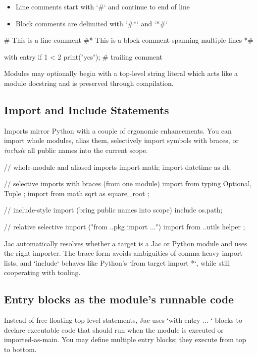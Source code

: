 \begin{itemize}
    \item Line comments start with `#` and continue to end of line
    \item Block comments are delimited with `#*` and `*#`
\end{itemize}

\begin{jacblock}
# This is a line comment
#*
This is a block comment
spanning multiple lines
*#

with entry {
    if 1 < 2 {
        print("yes");  # trailing comment
    }
}
\end{jacblock}

Modules may optionally begin with a top-level string literal which acts like a module docstring and is preserved through compilation.

\subsection{Import and Include Statements}

Imports mirror Python with a couple of ergonomic enhancements. You can import whole modules, alias them, selectively import symbols with braces, or \emph{include} all public names into the current scope.

\begin{jacblock}
// whole-module and aliased imports
import math;
import datetime as dt;

// selective imports with braces (from one module)
import from typing { Optional, Tuple };
import from math { sqrt as square_root };

// include-style import (bring public names into scope)
include os.path;

// relative selective import ("from ..pkg import {...}")
import from ..utils { helper };
\end{jacblock}

Jac automatically resolves whether a target is a Jac or Python module and uses the right importer. The brace form avoids ambiguities of comma-heavy import lists, and `include` behaves like Python's `from target import *`, while still cooperating with tooling.

\subsection{Entry blocks as the module's runnable code}

Instead of free-floating top-level statements, Jac uses `with entry { ... }` blocks to declare executable code that should run when the module is executed or imported-as-main. You may define multiple entry blocks; they execute from top to bottom.


